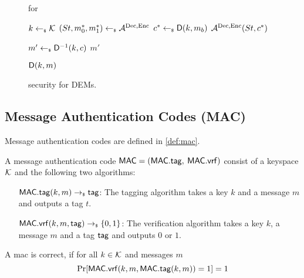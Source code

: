   \begin{figure}[!tbh]
    \begin{gamebox}{\indrcca for \dem}
      \begin{minipage}[t]{.5\linewidth}
        \begin{algorithmic}
          \State $k\gets_{\scriptscriptstyle\$} \mathcal{K}$
          \State $(St, m_0^*, m_1^*) \gets_{\scriptscriptstyle\$} \mathcal{A}_{\relax}^{\text{Dec},\text{Enc}}$
          \State $c^* \gets_{\scriptscriptstyle\$} {\mathsf{D}}(k, m_b)$
          \State \Return $\mathcal{A}_{\relax}^{\text{Dec},\text{Enc}}(St, c^*)$
        \end{algorithmic}
      \end{minipage}
    \hfill
      \begin{minipage}[t]{.48\linewidth}
        \begin{algorithmic}
          \State $m' \gets_{\scriptscriptstyle\$} {\mathsf{D}}^{-1}(k, c)$
          \State \Return {}
          \Else
          \State \Return $m'$
          \EndIf
        \end{algorithmic}
        \medskip
        \begin{algorithmic}
          \State \Return ${\mathsf{D}}(k, m)$
        \end{algorithmic}
      \end{minipage}
    \end{gamebox}
    \caption{\indrcca security for DEMs.}
    \label{fig:dem_rcca}
  \end{figure}

\subsection{Message Authentication Codes (MAC)}
Message authentication codes are defined in \cref{def:mac}.

\begin{definition}\label{def:mac}
  A message authentication code ${\mathsf{MAC}} = ({\mathsf{MAC}}.{\mathsf{tag}},$ $ {\mathsf{MAC}}.{\mathsf{vrf}})$ consist of a keyspace $\mathcal{K}$ and the following two
  algorithms:
  \begin{itemize}[align=left]
    \item[${\mathsf{MAC}}.{\mathsf{tag}}(k, m)\rightarrow_{\scriptscriptstyle\$} {\mathsf{tag}}$:] The tagging algorithm takes a key $k$ and a message $m$ and outputs
      a tag $t$.
    \item[${\mathsf{MAC}}.{\mathsf{vrf}}(k, m, {\mathsf{tag}})\rightarrow_{\scriptscriptstyle\$}\{0,1\}$:] The verification algorithm takes a key $k$, a message $m$ and
      a tag ${\mathsf{tag}}$ and outputs $0$ or $1$.
    \end{itemize}
    A mac \mac is correct, if for all $k\in\mathcal{K}$ and messages $m$
    \[
      \text{Pr}[{\mathsf{MAC}}.{\mathsf{vrf}}(k, m, {\mathsf{MAC}}.{\mathsf{tag}}(k,m)) = 1] = 1
    \]
\end{definition}

